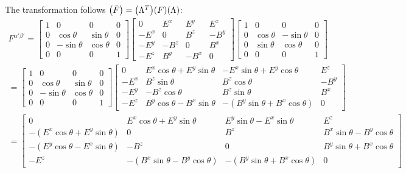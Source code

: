 \documentclass{report}
\begin{document}
\begin{subquests}
\begin{subquests}
		\item		
		The transformation follows $\pqty{\bar F} = \pqty{\Lambda^T}\pqty{F}\pqty{\Lambda}$:
		\begin{gather*}
			F^{\alpha'\beta'} =
			\begin{bmatrix}
				1 & 0 & 0 & 0 \\
				0 & \cos\theta & \sin\theta & 0 \\
				0 & -\sin\theta & \cos\theta & 0 \\
				0 & 0 & 0 & 1
			\end{bmatrix}
			\begin{bmatrix}
				0 & E^x & E^y & E^z \\
				-E^x & 0 & B^z & -B^y \\
				-E^y & -B^z & 0 & B^x \\
				-E^z & B^y & -B^x & 0
			\end{bmatrix}
			\begin{bmatrix}
				1 & 0 & 0 & 0 \\
				0 & \cos\theta & -\sin\theta & 0 \\
				0 & \sin\theta & \cos\theta & 0 \\
				0 & 0 & 0 & 1
			\end{bmatrix} \\
			=
			\begin{bmatrix}
				1 & 0 & 0 & 0 \\
				0 & \cos\theta & \sin\theta & 0 \\
				0 & -\sin\theta & \cos\theta & 0 \\
				0 & 0 & 0 & 1
			\end{bmatrix}
			\begin{bmatrix}
				0 & E^x\cos\theta + E^y\sin\theta & -E^x\sin\theta + E^y\cos\theta & E^z \\
				-E^x & B^z\sin\theta  & B^z\cos\theta & -B^y \\
				-E^y & -B^z\cos\theta & B^z\sin\theta & B^x \\
				-E^z & B^y\cos\theta - B^x\sin\theta & -(B^y\sin\theta + B^x\cos\theta) & 0
			\end{bmatrix} \\
			=
			\begin{bmatrix}
				0 & E^x\cos\theta + E^y\sin\theta & E^y\sin\theta - E^x\sin\theta & E^z \\
				-(E^x\cos\theta + E^y\sin\theta) & 0 & B^z & B^x\sin\theta-B^y\cos\theta \\
				-(E^y\cos\theta - E^x\sin\theta) & -B^z & 0 & B^y\sin\theta + B^x\cos\theta \\
				-E^z & -(B^x\sin\theta-B^y\cos\theta) & -(B^y\sin\theta + B^x\cos\theta) & 0
			\end{bmatrix}
		\end{gather*}
		

\end{subquests}
\end{subquests}
\end{document}
